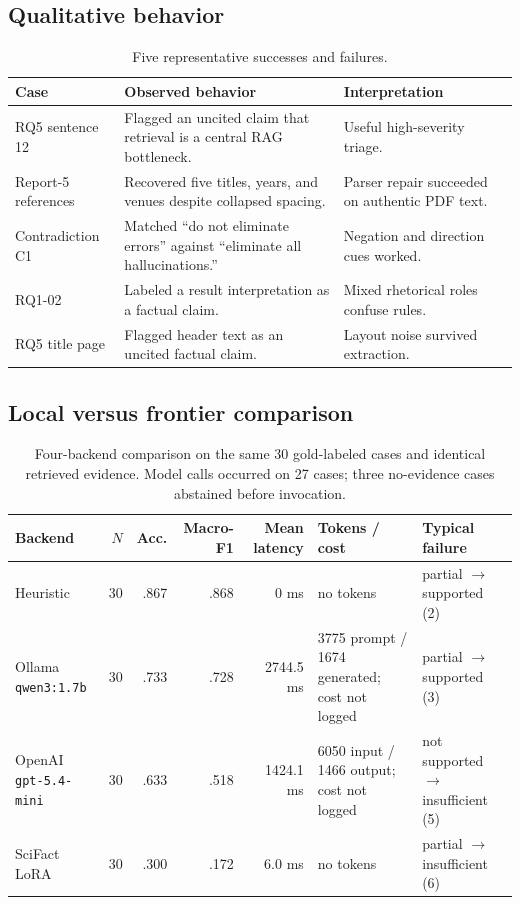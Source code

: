 \documentclass[12pt,toc=bib,toc=listof]{scrartcl}
\begin{document}
\subsection{Qualitative behavior}

\begin{table}[H]
\centering\footnotesize
\begin{tabularx}{\textwidth}{@{}p{2.25cm} Y p{3.35cm}@{}}
\toprule
Case & Observed behavior & Interpretation \\
\midrule
RQ5 sentence 12 & Flagged an uncited claim that retrieval is a central RAG bottleneck. & Useful high-severity triage. \\
Report-5 references & Recovered five titles, years, and venues despite collapsed spacing. & Parser repair succeeded on authentic PDF text. \\
Contradiction C1 & Matched ``do not eliminate errors'' against ``eliminate all hallucinations.'' & Negation and direction cues worked. \\
RQ1-02 & Labeled a result interpretation as a factual claim. & Mixed rhetorical roles confuse rules. \\
RQ5 title page & Flagged header text as an uncited factual claim. & Layout noise survived extraction. \\
\bottomrule
\end{tabularx}
\caption{Five representative successes and failures.}
\label{tab:qualitative}
\end{table}

\subsection{Local versus frontier comparison}

\begin{table}[H]
\centering
\scriptsize
\setlength{\tabcolsep}{3pt}
\begin{tabularx}{\textwidth}{@{}P{1.8cm}r r r r P{2.5cm}Y@{}}
\toprule
\textbf{Backend} & $N$ & \textbf{Acc.} & \textbf{Macro-F1} & \textbf{Mean latency} & \textbf{Tokens / cost} & \textbf{Typical failure} \\
\midrule
Heuristic & 30 & .867 & .868 & 0 ms & no tokens & partial $\rightarrow$ supported (2) \\
Ollama \texttt{qwen3:1.7b} & 30 & .733 & .728 & 2744.5 ms & 3775 prompt / 1674 generated; cost not logged & partial $\rightarrow$ supported (3) \\
OpenAI \texttt{gpt-5.4-mini} & 30 & .633 & .518 & 1424.1 ms & 6050 input / 1466 output; cost not logged & not supported $\rightarrow$ insufficient (5) \\
SciFact LoRA & 30 & .300 & .172 & 6.0 ms & no tokens & partial $\rightarrow$ insufficient (6) \\
\bottomrule
\end{tabularx}
\caption{Four-backend comparison on the same 30 gold-labeled cases and identical retrieved evidence. Model calls occurred on 27 cases; three no-evidence cases abstained before invocation.}
\label{tab:local_frontier}
\end{table}
\end{document}
